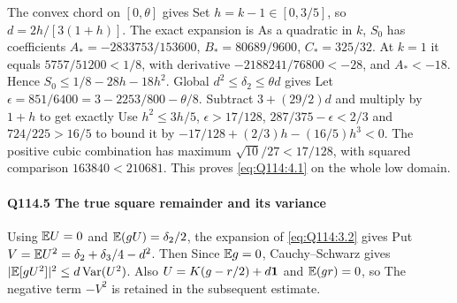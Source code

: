 The convex chord on $[0,\allowbreak \theta]$ gives
Set $h=\allowbreak k-1\in[0,\allowbreak 3/5]$, so $d=\allowbreak 2h/[3(1+h)]$.
The exact expansion is
As a quadratic in $k$, $S_0$ has coefficients
$A_*=\allowbreak -2833753/153600$, $B_*=\allowbreak 80689/9600$, $C_*=\allowbreak 325/32$.
At $k=\allowbreak 1$ it equals $5757/51200<\allowbreak 1/8$, with derivative
$-2188241/76800<\allowbreak -28$, and $A_*<\allowbreak -18$.
Hence $S_0\le\allowbreak 1/8-28h-18h^2$. Global $d^2\le\allowbreak \delta_2\le\allowbreak \theta d$ gives
Let $\epsilon=\allowbreak 851/6400=\allowbreak 3-2253/800-\theta/8$.
Subtract $3+(29/2)d$ and multiply by $1+h$ to get exactly
Use $h^2\le\allowbreak 3h/5$, $\epsilon>\allowbreak 17/128$,
$287/375-\epsilon<\allowbreak 2/3$ and $724/225>\allowbreak 16/5$ to bound it by
$-17/128+(2/3)h-(16/5)h^3<\allowbreak 0$.
The positive cubic combination has maximum $\sqrt{10}/27<\allowbreak 17/128$,
with squared comparison $163840<\allowbreak 210681$.
This proves \eqref{eq:Q114:4.1} on the whole low domain.

\paragraph{Q114.5 The true square remainder and its variance}\label{part:Q114.5}
Using $\mathbb E U=\allowbreak 0$ and $\mathbb E(gU)=\allowbreak \delta_2/2$, the expansion of
\eqref{eq:Q114:3.2} gives
Put $V=\allowbreak \mathbb E U^2=\allowbreak \delta_2+\delta_3/4-d^2$. Then
Since $\mathbb E g=\allowbreak 0$, Cauchy--Schwarz gives
$|\mathbb E[gU^2]|^2\le\allowbreak  d\operatorname{Var}(U^2)$.
Also $U=\allowbreak K(g-r/2)+d\mathbf1$ and $\mathbb E(gr)=\allowbreak 0$, so
The negative term $-V^2$ is retained in the subsequent estimate.

